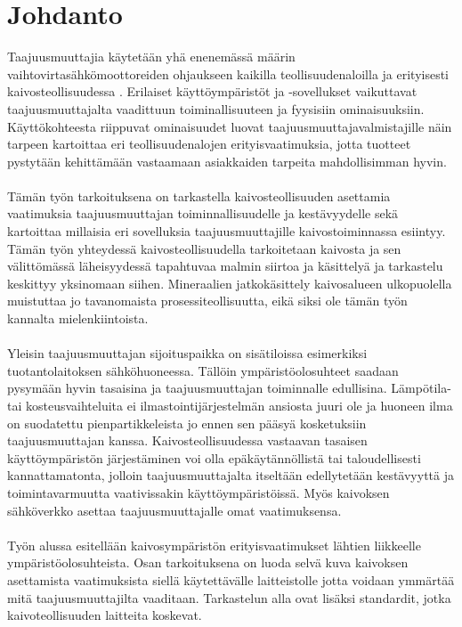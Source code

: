 \documentclass[finnish,12pt,a4paper,pdftex,elec,utf8]{aaltothesis}
\begin{document}
\section{Johdanto}

\thispagestyle{empty}
Taajuusmuuttajia käytetään yhä enenemässä määrin vaihtovirtasähkömoottoreiden ohjaukseen kaikilla teollisuudenaloilla ja erityisesti kaivosteollisuudessa \cite[s. 262]{Hakapää}. %
Erilaiset käyttöympäristöt ja -sovellukset vaikuttavat taajuusmuuttajalta vaadittuun toiminallisuuteen ja fyysisiin ominaisuuksiin. Käyttökohteesta riippuvat ominaisuudet luovat taajuusmuuttajavalmistajille näin tarpeen kartoittaa eri teollisuudenalojen erityisvaatimuksia, jotta tuotteet pystytään kehittämään vastaamaan asiakkaiden tarpeita mahdollisimman hyvin. 
\\\\
Tämän työn tarkoituksena on tarkastella kaivosteollisuuden asettamia vaatimuksia taajuusmuuttajan toiminnallisuudelle ja kestävyydelle sekä kartoittaa millaisia eri sovelluksia taajuusmuuttajille kaivostoiminnassa esiintyy. Tämän työn yhteydessä kaivosteollisuudella tarkoitetaan kaivosta ja sen välittömässä läheisyydessä tapahtuvaa malmin siirtoa ja käsittelyä ja tarkastelu keskittyy yksinomaan siihen. Mineraalien jatkokäsittely kaivosalueen ulkopuolella muistuttaa jo tavanomaista prosessiteollisuutta, eikä siksi ole tämän työn kannalta mielenkiintoista.
\\\\
Yleisin taajuusmuuttajan sijoituspaikka on sisätiloissa esimerkiksi tuotantolaitoksen sähköhuoneessa. Tällöin ympäristöolosuhteet saadaan pysymään hyvin tasaisina ja taajuusmuuttajan toiminnalle edullisina. Lämpötila- tai kosteusvaihteluita ei ilmastointijärjestelmän ansiosta juuri ole ja huoneen ilma on suodatettu pienpartikkeleista jo ennen sen pääsyä kosketuksiin taajuusmuuttajan kanssa. Kaivosteollisuudessa vastaavan tasaisen käyttöympäristön järjestäminen voi olla epäkäytännöllistä tai taloudellisesti kannattamatonta, jolloin taajuusmuuttajalta itseltään edellytetään kestävyyttä ja toimintavarmuutta vaativissakin käyttöympäristöissä. Myös kaivoksen sähköverkko asettaa taajuusmuuttajalle omat vaatimuksensa.
\\\\
Työn alussa esitellään kaivosympäristön erityisvaatimukset lähtien liikkeelle ympäristöolosuhteista. Osan tarkoituksena on luoda selvä kuva kaivoksen asettamista vaatimuksista siellä käytettävälle laitteistolle jotta voidaan ymmärtää mitä taajuusmuuttajilta vaaditaan. Tarkastelun alla ovat lisäksi standardit, jotka kaivoteollisuuden laitteita koskevat.
\end{document}
